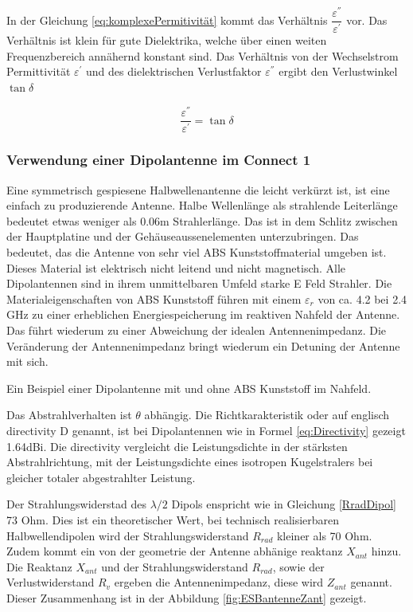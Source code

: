 In der Gleichung \ref{eq:komplexePermitivität} kommt das Verhältnis $\dfrac{\varepsilon^{''}}{\varepsilon^{'}}$ vor. Das Verhältnis ist klein für gute Dielektrika, welche über einen weiten Frequenzbereich annähernd konstant sind. Das Verhältnis von der Wechselstrom Permittivität $\varepsilon^{'}$ und des dielektrischen Verlustfaktor $\varepsilon^{''}$ ergibt den Verlustwinkel $\tan\delta$

\begin{equation} \label{eq:VerlustwinkelEpsilonPermitivität}
\dfrac{\varepsilon^{''}}{\varepsilon^{'}}=\tan\delta
\end{equation}


\subsubsection{Verwendung einer Dipolantenne im Connect 1}
Eine symmetrisch gespiesene Halbwellenantenne die leicht verkürzt ist,  ist eine einfach zu produzierende Antenne. Halbe Wellenlänge als strahlende Leiterlänge bedeutet etwas weniger als 0.06m Strahlerlänge. Das ist in dem Schlitz zwischen der Hauptplatine und der Gehäuseaussenelementen unterzubringen. 
Das bedeutet, das die Antenne von sehr viel ABS Kunststoffmaterial umgeben ist. Dieses Material ist elektrisch nicht leitend und nicht magnetisch. Alle Dipolantennen sind in ihrem unmittelbaren Umfeld starke E Feld Strahler.  Die Materialeigenschaften von ABS Kunststoff führen mit einem  $\varepsilon_r$ von ca. 4.2 bei 2.4 GHz zu einer erheblichen Energiespeicherung im reaktiven Nahfeld der Antenne. Das führt wiederum zu einer Abweichung der idealen Antennenimpedanz. Die Veränderung der Antennenimpedanz bringt wiederum ein Detuning der Antenne mit sich.

Ein Beispiel einer Dipolantenne mit und ohne ABS Kunststoff im Nahfeld.

Das Abstrahlverhalten ist $\theta$ abhängig. Die Richtkarakteristik oder auf englisch directivity D genannt, ist bei Dipolantennen wie in Formel \ref{eq:Directivity} gezeigt 1.64dBi. Die directivity vergleicht die Leistungsdichte in der stärksten Abstrahlrichtung, mit der Leistungsdichte eines isotropen Kugelstralers bei gleicher totaler abgestrahlter Leistung. 

Der Strahlungswiderstad des $\lambda/2$ Dipols enspricht wie in Gleichung \ref{RradDipol} 73 Ohm. Dies ist ein theoretischer Wert, bei technisch realisierbaren Halbwellendipolen wird der Strahlungswiderstand $R_{rad}$ kleiner als 70 Ohm. Zudem kommt  ein von der  geometrie der Antenne abhänige reaktanz $X_{ant}$ hinzu.
Die Reaktanz $X_{ant}$ und der Strahlungswiderstand $R_{rad}$, sowie der Verlustwiderstand $R_v$ ergeben die Antennenimpedanz, diese wird $Z_{ant}$  genannt. Dieser Zusammenhang ist  in der Abbildung \ref{fig:ESBantenneZant} gezeigt.

